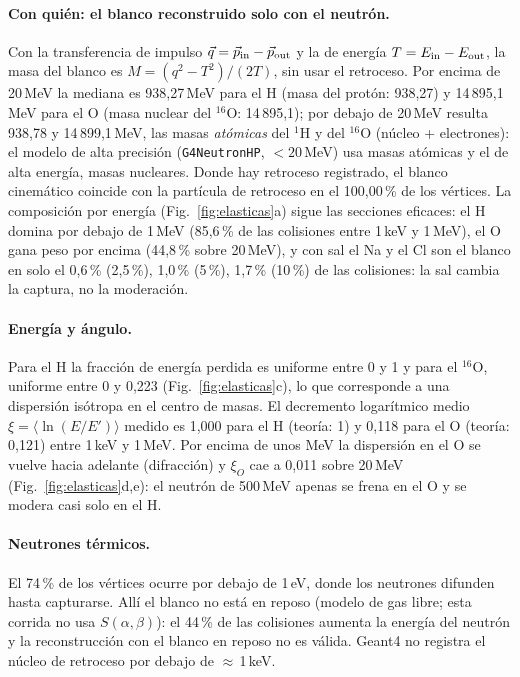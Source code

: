 \documentclass[11pt,a4paper]{article}
\begin{document}
\paragraph{Con quién: el blanco reconstruido solo con el neutrón.} Con la transferencia de impulso $\vec q = \vec p_{\rm in} - \vec p_{\rm out}$ y la de energía $T = E_{\rm in} - E_{\rm out}$, la masa del blanco es $M = (q^2 - T^2)/(2T)$, sin usar el retroceso.
Por encima de 20\,MeV la mediana es 938,27\,MeV para el H (masa del protón: 938,27) y 14\,895,1\,MeV para el O (masa nuclear del $^{16}$O: 14\,895,1);
por debajo de 20\,MeV resulta 938,78 y 14\,899,1\,MeV, las masas \emph{atómicas} del $^1$H y del $^{16}$O (núcleo + electrones):
el modelo de alta precisión (\texttt{G4NeutronHP}, $<20$\,MeV) usa masas atómicas y el de alta energía, masas nucleares. Donde hay retroceso registrado, el blanco cinemático coincide con la partícula de retroceso en el 100,00\,\% de los vértices.
La composición por energía (Fig.~\ref{fig:elasticas}a) sigue las secciones eficaces: el H domina por debajo de 1\,MeV (85,6\,\% de las colisiones entre 1\,keV y 1\,MeV), el O gana peso por encima (44,8\,\% sobre 20\,MeV),
y con sal el Na y el Cl son el blanco en solo el 0,6\,\% (2,5\,\%), 1,0\,\% (5\,\%), 1,7\,\% (10\,\%) de las colisiones: la sal cambia la captura, no la moderación.
\paragraph{Energía y ángulo.} Para el H la fracción de energía perdida es uniforme entre 0 y 1 y para el $^{16}$O, uniforme entre 0 y 0,223 (Fig.~\ref{fig:elasticas}c), lo que corresponde a una dispersión isótropa en el centro de masas.
El decremento logarítmico medio $\xi = \langle\ln(E/E')\rangle$ medido es 1,000 para el H (teoría: 1) y 0,118 para el O (teoría: 0,121) entre 1\,keV y 1\,MeV.
Por encima de unos MeV la dispersión en el O se vuelve hacia adelante (difracción) y $\xi_O$ cae a 0,011 sobre 20\,MeV (Fig.~\ref{fig:elasticas}d,e): el neutrón de 500\,MeV apenas se frena en el O y se modera casi solo en el H.
\paragraph{Neutrones térmicos.} El 74\,\% de los vértices ocurre por debajo de 1\,eV, donde los neutrones difunden hasta capturarse. Allí el blanco no está en reposo (modelo de gas libre; esta corrida no usa $S(\alpha,\beta)$):
el 44\,\% de las colisiones aumenta la energía del neutrón y la reconstrucción con el blanco en reposo no es válida. Geant4 no registra el núcleo de retroceso por debajo de $\approx$\,1\,keV.
\end{document}
